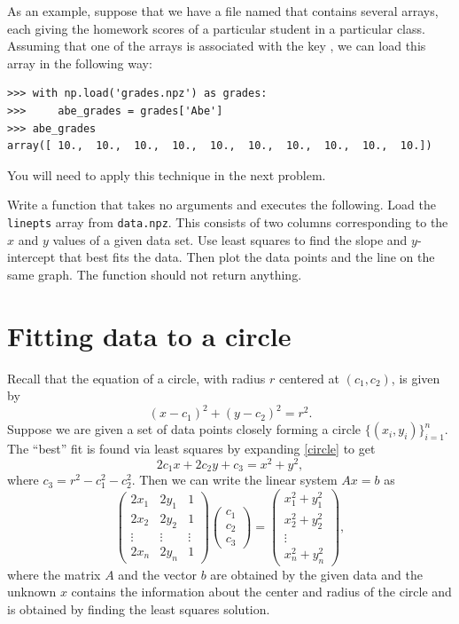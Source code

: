 As an example, suppose that we have a file named  that contains several arrays, each giving the
homework scores of a particular student in a particular class. Assuming that one of the arrays is associated with
the key , we can load this array in the following way:

\begin{lstlisting}
>>> with np.load('grades.npz') as grades:
>>>     abe_grades = grades['Abe']
>>> abe_grades
array([ 10.,  10.,  10.,  10.,  10.,  10.,  10.,  10.,  10.,  10.])
\end{lstlisting}

You will need to apply this technique in the next problem.

\begin{problem}
Write a function  that takes no arguments and executes the following.
Load the \texttt{linepts} array from \texttt{data.npz}.
This consists of two columns corresponding to the $x$ and $y$ values of a given data set.
Use least squares to find the slope and $y$-intercept that best fits the data.
Then plot the data points and the line on the same graph.
The function should not return anything.
\end{problem}

\section*{Fitting data to a circle}

Recall that the equation of a circle, with radius $r$ centered at $(c_1,c_2)$, is given by
\begin{equation}
\label{circle}
(x-c_1)^2 + (y-c_2)^2 = r^2.
\end{equation}
Suppose we are given a set of data points closely forming a circle $\{(x_i,y_i)\}^n_{i=1}$.
The ``best'' fit is found via least squares by expanding \eqref{circle} to get
\[
2 c_1 x + 2 c_2 y + c_3 = x^2 + y^2,
\]
where $c_3 = r^2 - c_1^2 - c_2^2$.  Then we can write the linear system $A x = b$ as
\[
\begin{pmatrix}
2 x_1 & 2 y_1 & 1\\
2 x_2 & 2 y_2 & 1\\
\vdots & \vdots & \vdots \\
2 x_n & 2 y_n & 1
\end{pmatrix}
\begin{pmatrix}
c_1\\
c_2\\
c_3
\end{pmatrix}=
\begin{pmatrix}
x_1^2 + y_1^2\\
x_2^2 + y_2^2\\
\vdots\\
x_n^2 + y_n^2
\end{pmatrix},
\]
where the matrix $A$ and the vector $b$ are obtained by the given data and the unknown
$x$ contains the information about the center and radius of the circle and is obtained
by finding the least squares solution.

